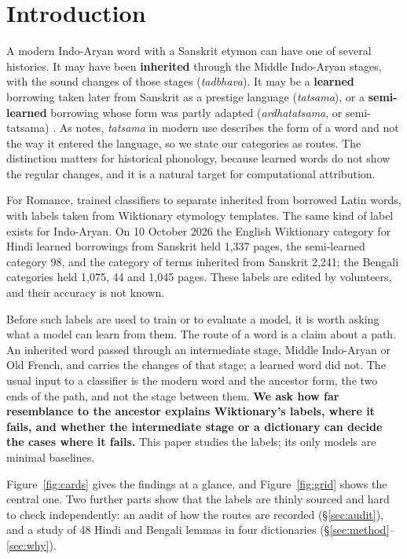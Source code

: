 \documentclass[11pt]{article}
\begin{document}
\section{Introduction}

A modern Indo-Aryan word with a Sanskrit etymon can have one of several histories. It may have been \textbf{inherited} through the Middle Indo-Aryan stages, with the sound changes of those stages (\textit{tadbhava}). It may be a \textbf{learned} borrowing taken later from Sanskrit as a prestige language (\textit{tatsama}), or a \textbf{semi-learned} borrowing whose form was partly adapted (\textit{ardhatatsama}, or semi-tatsama) \citep[\S111]{chatterji1926}. As \citeauthor{chatterji1926} notes, \textit{tatsama} in modern use describes the form of a word and not the way it entered the language, so we state our categories as routes. The distinction matters for historical phonology, because learned words do not show the regular changes, and it is a natural target for computational attribution.

For Romance, \citet{cristea2021inherited} trained classifiers to separate inherited from borrowed Latin words, with labels taken from Wiktionary etymology templates. The same kind of label exists for Indo-Aryan. On 10 October 2026 the English Wiktionary category for Hindi learned borrowings from Sanskrit held 1,337 pages, the semi-learned category 98, and the category of terms inherited from Sanskrit 2,241; the Bengali categories held 1,075, 44 and 1,045 pages. These labels are edited by volunteers, and their accuracy is not known.

Before such labels are used to train or to evaluate a model, it is worth asking what a model can learn from them. The route of a word is a claim about a path. An inherited word passed through an intermediate stage, Middle Indo-Aryan or Old French, and carries the changes of that stage; a learned word did not. The usual input to a classifier is the modern word and the ancestor form, the two ends of the path, and not the stage between them. \textbf{We ask how far resemblance to the ancestor explains Wiktionary's labels, where it fails, and whether the intermediate stage or a dictionary can decide the cases where it fails.} This paper studies the labels; its only models are minimal baselines.

Figure~\ref{fig:cards} gives the findings at a glance, and Figure~\ref{fig:grid} shows the central one. Two further parts show that the labels are thinly sourced and hard to check independently: an audit of how the routes are recorded (\S\ref{sec:audit}), and a study of 48 Hindi and Bengali lemmas in four dictionaries (\S\ref{sec:method}--\ref{sec:why}).
\end{document}
